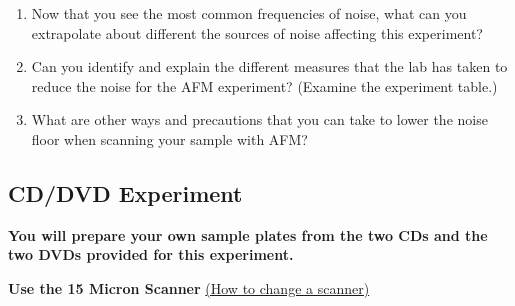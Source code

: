 \documentclass{../lab}
\begin{document}
\begin{enumerate}
    \item Now that you see the most common frequencies of noise, what can you extrapolate about different the sources of noise affecting this experiment?

    \item Can you identify and explain the different measures that the lab has taken to reduce the noise for the AFM experiment? (Examine the experiment table.)

    \item What are other ways and precautions that you can take to lower the noise floor when scanning your sample with AFM?

\end{enumerate}

\subsection{CD/DVD Experiment}
\label{subsec:CD/DVD}

\textbf{You will prepare your own sample plates from the two CDs and the two DVDs provided for this experiment.}

\textbf{Use the 15 Micron Scanner} \hyperref[subsec:ChangingScanners]{(How to change a scanner)}
\end{document}

